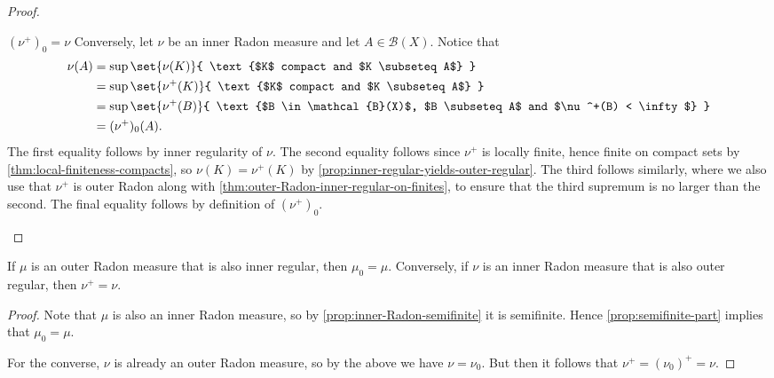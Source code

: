 \documentclass[article, a4paper, 11pt, oneside]{memoir}
\numberwithin{equation}{chapter}
\newcommand{\calB}{\mathcal{B}}
\newcommand{\borel}[1]{\calB(#1)}
\begin{document}
\begin{proof}
\begin{proofsec}
    \item[$(\nu^+)_0 = \nu$]
    Conversely, let $\nu$ be an inner Radon measure and let $A \in \borel{X}$. Notice that
    \begin{align*}
        \nu(A)
            &= \sup \set{\nu(K)}{ \text{$K$ compact and $K \subseteq A$} } \\
            &= \sup \set{\nu^+(K)}{ \text{$K$ compact and $K \subseteq A$} } \\
            &= \sup \set{\nu^+(B)}{ \text{$B \in \borel{X}$, $B \subseteq A$ and $\nu^+(B) < \infty$} } \\
            &= (\nu^+)_0(A).
    \end{align*}
    The first equality follows by inner regularity of $\nu$. The second equality follows since $\nu^+$ is locally finite, hence finite on compact sets by \cref{thm:local-finiteness-compacts}, so $\nu(K) = \nu^+(K)$ by \cref{prop:inner-regular-yields-outer-regular}. The third follows similarly, where we also use that $\nu^+$ is outer Radon along with \cref{thm:outer-Radon-inner-regular-on-finites}, to ensure that the third supremum is no larger than the second. The final equality follows by definition of $(\nu^+)_0$.
\end{proofsec}
\end{proof}


\begin{proposition}
    If $\mu$ is an outer Radon measure that is also inner regular, then $\mu_0 = \mu$. Conversely, if $\nu$ is an inner Radon measure that is also outer regular, then $\nu^+ = \nu$.
\end{proposition}

\begin{proof}
    Note that $\mu$ is also an inner Radon measure, so by \cref{prop:inner-Radon-semifinite} it is semifinite. Hence \cref{prop:semifinite-part} implies that $\mu_0 = \mu$.

    For the converse, $\nu$ is already an outer Radon measure, so by the above we have $\nu = \nu_0$. But then it follows that $\nu^+ = (\nu_0)^+ = \nu$.
\end{proof}
\end{document}
